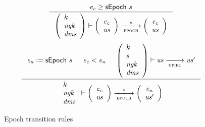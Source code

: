 \documentclass[11pt,a4paper]{article}
\newcommand{\var}[1]{\mathit{#1}}
\newcommand{\trans}[2]{\xlongrightarrow[\textsc{#1}]{#2}}
\newcommand{\leteq}{\ensuremath{\mathrel{\mathop:}=}}
\begin{document}
\begin{figure}[ht]
  \begin{equation*}
    \inference
    {
      \var{e_c} \geq \sepoch{s}
    }
    {
      {\left(
        \begin{array}{l}
          k\\
          \var{ngk}\\
          \var{dms}
        \end{array}
      \right)}
      \vdash
      {
        \left(
          {\begin{array}{c}
             \var{e_c} \\
             \var{us}
           \end{array}
         }
       \right)
     }
     \trans{epoch}{s}
     {
       \left(
         {\begin{array}{c}
            \var{e_c} \\
            \var{us}
          \end{array}
        }
      \right)
    }
  }
\end{equation*}
\vspace{20pt}
\begin{equation*}
  \inference
  {
    \var{e_n} \leteq \sepoch{s}
    & \var{e_c} < \var{e_n}
    &
    {\left(
        \begin{array}{l}
          k\\
          s\\
          \var{ngk}\\
          \var{dms}
        \end{array}
      \right)
    }
    \vdash \var{us} \trans{upiec}{} \var{us'}
  }
  {
    {
      \begin{array}{l}
        k\\
        \var{ngk}\\
        \var{dms}
      \end{array}
    }
    \vdash
    {
      \left(
        {\begin{array}{c}
           \var{e_c} \\
           \var{us}
         \end{array}
       }
     \right)
   }
   \trans{epoch}{s}
   {
     \left(
       {\begin{array}{c}
          \var{e_n} \\
          \var{us'}
        \end{array}
      }
    \right)
  }
}
\end{equation*}
\caption{Epoch transition rules}
\label{fig:rules:epoch}
\end{figure}
\end{document}

